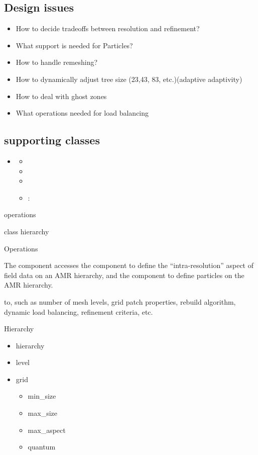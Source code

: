 \subsection{Design issues}

\begin{itemize}
    \item How to decide tradeoffs between  resolution and 
      refinement?
    \item What support is needed for Particles?
    \item How to handle remeshing?
    \item How to dynamically adjust tree size (23,43, 83,
      etc.)(adaptive adaptivity)
    \item How to deal with ghost zones
    \item What operations needed for load balancing
\end{itemize}

\subsection{ supporting classes}

\begin{itemize}
    \item {}
    \begin{itemize}
          \item {}
          \item {}
          \item {}
          \item {}: 
    \end{itemize}
\end{itemize}

 operations

 class hierarchy

Operations

The  component accesses the  component to
define the ``intra-resolution'' aspect of field data on an AMR
hierarchy, and the  component to define particles on
the AMR hierarchy.  

to, such as number of mesh levels, grid patch properties,
rebuild algorithm, dynamic load balancing, refinement criteria, etc.

Hierarchy


\begin{itemize}
\item hierarchy
\item level
\item grid
\begin{itemize}
\item min\_size
\item max\_size
\item max\_aspect
\item quantum
\end{itemize}
\end{itemize}

